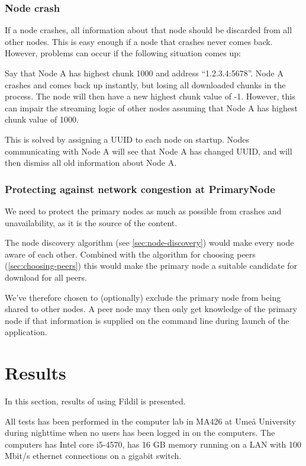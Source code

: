 \documentclass[10pt, a4paper]{article}
\begin{document}
\subsubsection{Node crash}

If a node crashes, all information about that node should be discarded from all
other nodes. This is easy enough if a node that crashes never comes
back. However, problems can occur if the following situation comes up:

Say that Node A has highest chunk 1000 and address ``1.2.3.4:5678''. Node A
crashes and comes back up instantly, but losing all downloaded chunks in the
process. The node will then have a new highest chunk value of -1. However, this
can impair the streaming logic of other nodes assuming that Node A has highest
chunk value of 1000.

This is solved by assigning a UUID to each node on startup. Nodes communicating
with Node A will see that Node A has changed UUID, and will then dismiss all old
information about Node A.

\subsubsection{Protecting against network congestion at PrimaryNode}

We need to protect the primary nodes as much as possible from crashes and
unavailability, as it is the source of the content.

The node discovery algorithm (see \autoref{sec:node-discovery}) would make every
node aware of each other. Combined with the algorithm for choosing peers
(\autoref{sec:choosing-peers}) this would make the primary node a suitable
candidate for download for all peers.

We've therefore chosen to (optionally) exclude the primary node from being
shared to other nodes. A peer node may then only get knowledge of the primary
node if that information is supplied on the command line during launch of the
application.

\section{Results}
\label{sec:results}

In this section, results of using Fildil is presented.

All tests has been performed in the computer lab in MA426 at Umeå University
during nighttime when no users has been logged in on the computers. The
computers has Intel core i5-4570, has 16 GB memory running on a LAN with 100
Mbit/s ethernet connections on a gigabit switch.
\end{document}
